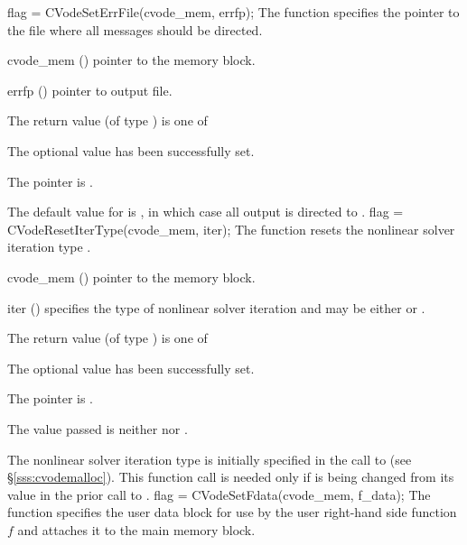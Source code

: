 {
flag = CVodeSetErrFile(cvode\_mem, errfp);
}
{
  The function  specifies the pointer to the file
  where all {\cvode} messages should be directed.
}
{
  \begin{args}
  \item[cvode\_mem] ()
    pointer to the {\cvode} memory block.
  \item[errfp] ()
    pointer to output file.
  \end{args}
}
{
  The return value  (of type ) is one of
  \begin{args}
  \item[\Id{SUCCESS}] 
    The optional value has been successfully set.
  \item[\Id{CVS\_NO\_MEM}]
    The  pointer is .
  \end{args}
}
{
  The default value for  is , in which case
  all output is directed to .
}
{
flag = CVodeResetIterType(cvode\_mem, iter);
}
{
  The function  resets the nonlinear solver
  iteration type .
}
{
  \begin{args}
  \item[cvode\_mem] ()
    pointer to the {\cvode} memory block.
  \item[iter] ()
    specifies the type of nonlinear solver iteration and may be
    either  or . 
  \end{args}
}
{
  The return value  (of type ) is one of
  \begin{args}
  \item[\Id{SUCCESS}] 
    The optional value has been successfully set.
  \item[\Id{CVS\_NO\_MEM}]
    The  pointer is .
  \item[\Id{CVS\_ILL\_INPUT}]
    The  value passed is neither  nor .
  \end{args}
}
{
  The nonlinear solver iteration type is initially specified in the call
  to  (see \S\ref{sss:cvodemalloc}). This function call is
  needed only if  is being changed from its value in the prior call 
  to .
}
{
  flag = CVodeSetFdata(cvode\_mem, f\_data);
}
{
  The function  specifies the user data block 
  for use by the user right-hand side function $f$ and attaches it to the main 
  {\cvode} memory block.
}
